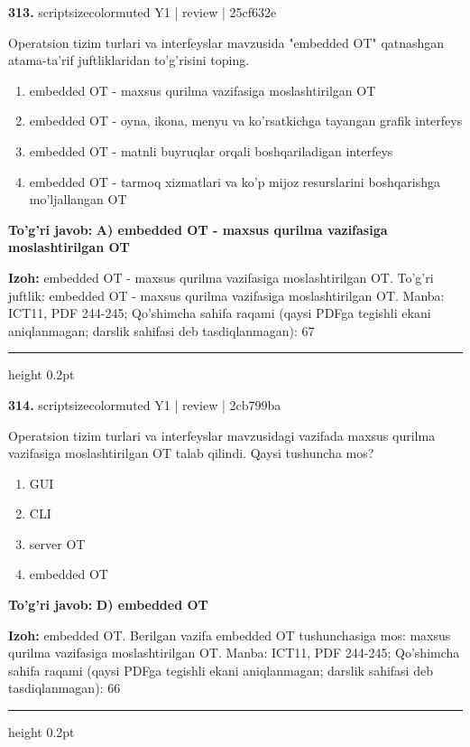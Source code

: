 \documentclass[10pt,a4paper]{article}
\begin{document}
{\bfseries\sffamily\color{ink} 313.} {scriptsizecolor{muted} Y1 | review | 25cf632e}
\par
Operatsion tizim turlari va interfeyslar mavzusida "embedded OT" qatnashgan atama-ta'rif juftliklaridan to'g'risini toping.
\begin{enumerate}[label=\Alph*),leftmargin=9mm]
\item embedded OT - maxsus qurilma vazifasiga moslashtirilgan OT
\item embedded OT - oyna, ikona, menyu va ko'rsatkichga tayangan grafik interfeys
\item embedded OT - matnli buyruqlar orqali boshqariladigan interfeys
\item embedded OT - tarmoq xizmatlari va ko'p mijoz resurslarini boshqarishga mo'ljallangan OT
\end{enumerate}
\begin{tcolorbox}[enhanced,breakable,colback=teal!4,colframe=teal!60!black,boxrule=0.45pt,arc=1.2mm,left=2.7mm,right=2.7mm,top=1.8mm,bottom=1.8mm,before skip=2mm,after skip=2mm]
{\bfseries\sffamily\color{teal}To'g'ri javob:} \textbf{A) embedded OT - maxsus qurilma vazifasiga moslashtirilgan OT}
\par\smallskip
{\bfseries Izoh:} embedded OT - maxsus qurilma vazifasiga moslashtirilgan OT. To'g'ri juftlik: embedded OT - maxsus qurilma vazifasiga moslashtirilgan OT. Manba: ICT11, PDF 244-245; Qo'shimcha sahifa raqami (qaysi PDFga tegishli ekani aniqlanmagan; darslik sahifasi deb tasdiqlanmagan): 67
\end{tcolorbox}
\vspace{2mm}\hrule height 0.2pt\vspace{3mm}

{\bfseries\sffamily\color{ink} 314.} {scriptsizecolor{muted} Y1 | review | 2cb799ba}
\par
Operatsion tizim turlari va interfeyslar mavzusidagi vazifada maxsus qurilma vazifasiga moslashtirilgan OT talab qilindi. Qaysi tushuncha mos?
\begin{enumerate}[label=\Alph*),leftmargin=9mm]
\item GUI
\item CLI
\item server OT
\item embedded OT
\end{enumerate}
\begin{tcolorbox}[enhanced,breakable,colback=teal!4,colframe=teal!60!black,boxrule=0.45pt,arc=1.2mm,left=2.7mm,right=2.7mm,top=1.8mm,bottom=1.8mm,before skip=2mm,after skip=2mm]
{\bfseries\sffamily\color{teal}To'g'ri javob:} \textbf{D) embedded OT}
\par\smallskip
{\bfseries Izoh:} embedded OT. Berilgan vazifa embedded OT tushunchasiga mos: maxsus qurilma vazifasiga moslashtirilgan OT. Manba: ICT11, PDF 244-245; Qo'shimcha sahifa raqami (qaysi PDFga tegishli ekani aniqlanmagan; darslik sahifasi deb tasdiqlanmagan): 66
\end{tcolorbox}
\vspace{2mm}\hrule height 0.2pt\vspace{3mm}
\end{document}
